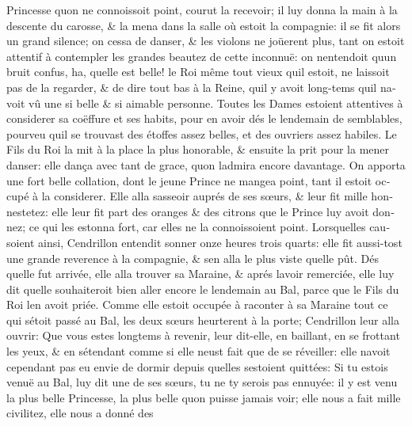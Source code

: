 \documentclass[14pt,a4paper]{memoir}
\begin{document}
\begin{otherlanguage}{french}
Princesse qu\textquotesingle on ne connoissoit point, courut la
recevoir; il luy donna la main à la descente du carosse, \& la mena dans
la salle où estoit la compagnie: il se fit alors un grand silence; on
cessa de danser, \& les violons ne joüerent plus, tant on estoit
attentif à contempler les grandes beautez de cette inconnuë: on
n\textquotesingle entendoit qu\textquotesingle un bruit confus, ha,
qu\textquotesingle elle est belle! le Roi même tout vieux
qu\textquotesingle il estoit, ne laissoit pas de la regarder, \& de dire
tout bas à la Reine, qu\textquotesingle il y avoit long-tems
qu\textquotesingle il n\textquotesingle avoit vû une si belle \& si
aimable personne. Toutes les Dames estoient attentives à considerer sa
coëffure et ses habits, pour en avoir dés le lendemain de semblables,
pourveu qu\textquotesingle il se trouvast des étoffes assez belles, et
des ouvriers assez habiles. Le Fils du Roi la mit à la place la plus
honorable, \& ensuite la prit pour la mener danser: elle dança avec tant
de grace, qu\textquotesingle on l\textquotesingle admira encore
davantage. On apporta une fort belle collation, dont le jeune Prince ne
mangea point, tant il estoit occupé à la considerer. Elle alla
s\textquotesingle asseoir auprés de ses sœurs, \& leur fit mille
honnestetez: elle leur fit part des oranges \& des citrons que le Prince
luy avoit donnez; ce qui les estonna fort, car elles ne la connoissoient
point. Lorsqu\textquotesingle elles causoient ainsi, Cendrillon entendit
sonner onze heures trois quarts: elle fit aussi-tost une grande
reverence à la compagnie, \& s\textquotesingle en alla le plus viste
qu\textquotesingle elle pût. Dés qu\textquotesingle elle fut arrivée,
elle alla trouver sa Maraine, \& aprés l\textquotesingle avoir
remerciée, elle luy dit qu\textquotesingle elle souhaiteroit bien aller
encore le lendemain au Bal, parce que le Fils du Roi
l\textquotesingle en avoit priée. Comme elle estoit occupée à raconter à
sa Maraine tout ce qui s\textquotesingle étoit passé au Bal, les deux
sœurs heurterent à la porte; Cendrillon leur alla ouvrir: Que vous estes
longtems à revenir, leur dit-elle, en baillant, en se frottant les yeux,
\& en s\textquotesingle étendant comme si elle n\textquotesingle eust
fait que de se réveiller: elle n\textquotesingle avoit cependant pas eu
envie de dormir depuis qu\textquotesingle elles
s\textquotesingle estoient quittées: Si tu estois venuë au Bal, luy dit
une de ses sœurs, tu ne t\textquotesingle y serois pas ennuyée: il y est
venu la plus belle Princesse, la plus belle qu\textquotesingle on puisse
jamais voir; elle nous a fait mille civilitez, elle nous a donné des

\end{otherlanguage}
\end{document}

